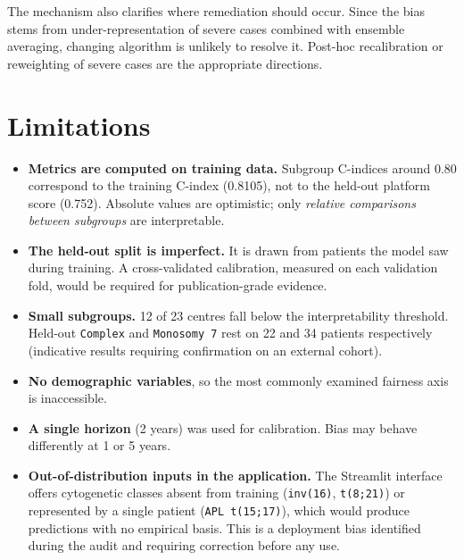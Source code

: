 \documentclass[11pt,a4paper]{article}
\newcommand{\var}[1]{\texttt{#1}}                      %
\begin{document}
The mechanism also clarifies where remediation should occur. Since the bias stems from
under-representation of severe cases combined with ensemble averaging, changing algorithm is
unlikely to resolve it. Post-hoc recalibration or reweighting of severe cases are the
appropriate directions.

\section{Limitations}

\begin{itemize}[leftmargin=*]
  \item \textbf{Metrics are computed on training data.} Subgroup C-indices around 0.80
        correspond to the training C-index (0.8105), not to the held-out platform score
        (0.752). Absolute values are optimistic; only \emph{relative comparisons between
        subgroups} are interpretable.
  \item \textbf{The held-out split is imperfect.} It is drawn from patients the model saw
        during training. A cross-validated calibration, measured on each validation fold, would
        be required for publication-grade evidence.
  \item \textbf{Small subgroups.} 12 of 23 centres fall below the interpretability threshold.
        Held-out \var{Complex} and \var{Monosomy 7} rest on 22 and 34 patients respectively 
        (indicative results requiring confirmation on an external cohort).
  \item \textbf{No demographic variables}, so the most commonly examined fairness axis is
        inaccessible.
  \item \textbf{A single horizon} (2 years) was used for calibration. Bias may behave
        differently at 1 or 5 years.
  \item \textbf{Out-of-distribution inputs in the application.} The Streamlit interface offers
        cytogenetic classes absent from training (\var{inv(16)}, \var{t(8;21)}) or represented
        by a single patient (\var{APL t(15;17)}), which would produce predictions with no
        empirical basis. This is a deployment bias identified during the audit and requiring
        correction before any use.
\end{itemize}
\end{document}
